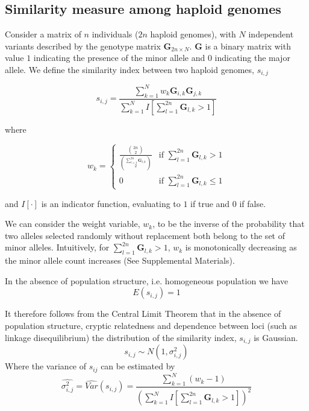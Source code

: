 \subsection{Similarity measure among haploid genomes}

Consider a matrix of $n$ individuals ($2n$ haploid genomes), with
$N$ independent variants described by the genotype matrix $\mathbf{G}_{2n\times N}$.
$\mathbf{G}$ is a binary matrix with value $1$ indicating the presence
of the minor allele and $0$ indicating the major allele. We define
the similarity index between two haploid genomes, $s_{i,j}$

\begin{equation}
s_{i,j}=\frac{\sum_{k=1}^{N}w_{k}\mathbf{G}_{i,k}\mathbf{G}_{j,k}}{\sum_{k=1}^{N}I\left[\sum_{l=1}^{2n}\mathbf{G}_{l,k}>1\right]}\label{eq:s equation}
\end{equation}

where 

\[
w_{k}=\begin{cases}
\frac{{2n \choose 2}}{{\sum_{l=1}^{2n}\mathbf{G}_{l,k} \choose 2}} & \text{if } \sum_{l=1}^{2n}\mathbf{G}_{l,k}>1\\
0 & \text{if } \sum_{l=1}^{2n}\mathbf{G}_{l,k}\le1
\end{cases}
\]

and $I[\cdot]$ is an indicator function, evaluating to $1$ if true and $0$ if false.

We can consider the weight variable, $w_k$, to be the inverse of the probability that two alleles selected randomly without replacement both belong to the set of minor alleles.  Intuitively, for $\sum_{l=1}^{2n}\mathbf{G}_{l,k}>1$, $w_k$ is monotonically decreasing as the minor allele count increases (See Supplemental Materials).

In the absence of population structure, i.e. homogeneous population
we have
\begin{equation}
E\left(s_{i,j}\right)=1
\label{eq:expectation_equation}
\end{equation}

It therefore follows from the Central Limit Theorem that in the absence
of population structure, cryptic relatedness and dependence between
loci (such as linkage disequilibrium) the distribution of the similarity
index, $s_{i,j}$ is Gaussian.
\[
s_{i,j}\sim N\left(1,\sigma_{i,j}^{2}\right)
\]
Where the variance of $s_{ij}$ can be estimated by 
\begin{equation}
\hat{\sigma_{i,j}^{2}}=\hat{Var}\left(s_{i,j}\right)=\frac{\sum_{k=1}^{N}\left(w_{k}-1\right)}{\left(\sum_{k=1}^{N}I\left[\sum_{l=1}^{2n}\mathbf{G}_{l,k}>1\right]\right)^{2}}
\label{eq:variance_equation}
\end{equation}

